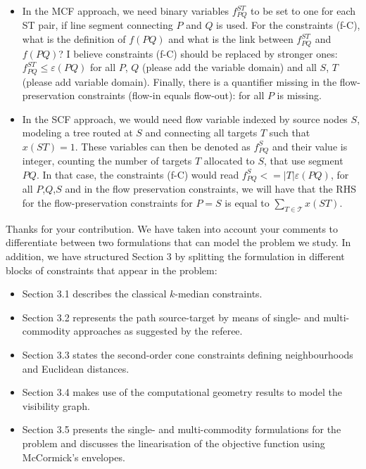 \documentclass{article}
\newenvironment{reviewer}{\setcounter{pointcounter}{1}}{}
\newcommand{\point}{\text{{\selectfont \thepointcounter} \stepcounter{pointcounter}}}
\begin{document}
\begin{reviewer}
\begin{itshape}
			\begin{itemize}
				\item In the MCF approach, we need binary variables $f^{ST}_{PQ}$ to be set to one for each ST pair, if line segment connecting $P$ and $Q$ is used. For the constraints (f-C), what is the definition of $f(PQ)$ and what is the link between $f^{ST}_{PQ}$ and $f(PQ)$? I believe constraints (f-C) should be replaced by stronger ones: $f^{ST}_{PQ}\leq \varepsilon(PQ)$ for all $P$, $Q$ (please add the variable domain) and all $S$, $T$ (please add variable domain). Finally, there is a quantifier missing in the flow-preservation constraints (flow-in equals flow-out): for all $P$ is missing.
				\item In the SCF approach, we would need flow variable indexed by source nodes $S$, modeling a tree routed at $S$ and connecting all targets $T$ such that $x(ST)=1$. These variables can then be denoted as $f^S_{PQ}$ and their value is integer, counting the number of targets $T$ allocated to $S$, that use segment $PQ$. In that case, the constraints (f-C) would read $f^S_{PQ} <= |T| \varepsilon(PQ)$, for all $P$,$Q$,$S$ and in the flow preservation constraints, we will have that the RHS for the flow-preservation constraints for $P=S$ is equal to $\sum_{T \in \mathcal T} x(ST)$.
			\end{itemize}
		
		\end{itshape}


		\begin{tcolorbox}[breakable,enhanced,coltitle=black,colback=green!5!white,colframe=green!75!black,title=\textbf{Answer R2.\point},borderline={1pt}{0pt}{black},boxrule=0pt]
			Thanks for your contribution. We have taken into account your comments to differentiate between two formulations that can model the problem we study. In addition, we have structured Section 3 by splitting the formulation in different blocks of constraints that appear in the problem:
			\begin{itemize}
				\item Section 3.1 describes the classical $k$-median constraints.
				\item Section 3.2 represents the path source-target by means of single- and multi-commodity approaches as suggested by the referee.
				\item Section 3.3 states the second-order cone constraints defining neighbourhoods and Euclidean distances.
				\item Section 3.4 makes use of the computational geometry results to model the visibility graph.
				\item Section 3.5 presents the single- and multi-commodity formulations for the problem and discusses the linearisation of the objective function using McCormick's envelopes.
			\end{itemize}
		\end{tcolorbox}
		

\end{reviewer}
\end{document}
